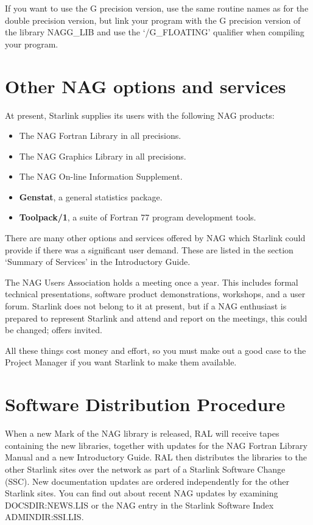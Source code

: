 If you want to use the G precision version, use the same routine names as for
the double precision version, but link your program with the G
precision version of the library NAGG\_LIB and use the `/G\_FLOATING' qualifier
when compiling your program.

\section{Other NAG options and services}

At present, Starlink supplies its users with the following NAG products:

\begin{itemize}
\item The NAG Fortran Library in all precisions.
\item The NAG Graphics Library in all precisions.
\item The NAG On-line Information Supplement.
\item {\bf Genstat}, a general statistics package.
\item {\bf Toolpack/1}, a suite of Fortran 77 program development tools.
\end{itemize}

There are many other options and services offered by NAG which Starlink could
provide if there was a significant user demand. These are listed in the section
`Summary of Services' in the Introductory Guide.

The NAG Users Association holds a meeting once a year. This includes formal
technical presentations, software product demonstrations, workshops, and a user
forum. Starlink does not belong to it at present, but if a NAG enthusiast is
prepared to represent Starlink and attend and report on the meetings, this
could be changed; offers invited.

All these things cost money and effort, so you must make out a good case to the
Project Manager if you want Starlink to make them available.

\section{Software Distribution Procedure}

When a new Mark of the NAG library is released, RAL will receive tapes
containing the new libraries, together with updates for the NAG Fortran Library
Manual and a new Introductory Guide. RAL then distributes the libraries to the
other Starlink sites over the network as part of a Starlink Software Change
(SSC). New documentation updates are ordered independently for the other
Starlink sites. You can find out about recent NAG updates by examining
DOCSDIR:NEWS.LIS or the NAG entry in the Starlink Software Index
ADMINDIR:SSI.LIS.

